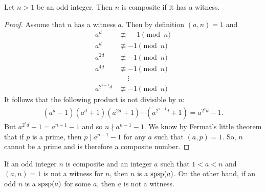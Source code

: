 \documentclass{subfiles}
\begin{document}
		\begin{theorem}
			Let $n>1$ be an odd integer. Then $n$ is composite if it has a witness.
		\end{theorem}

		\begin{proof}
			Assume that $n$ has a witness $a$. Then by definition $(a,n)=1$ and
				\begin{align*}
					a^d &\not \equiv \phantom{-}1 \pmod n\\
					a^d &\not \equiv -1 \pmod n\\
					a^{2d} &\not \equiv -1 \pmod n\\
					a^{4d} &\not \equiv -1 \pmod n\\
					&\phantom{\equiv}\vdots\\
					a^{2^{s-1}d} &\not \equiv -1 \pmod n
				\end{align*}
			It follows that the following product is not divisible by $n$:
				\begin{align*}
					\left(a^d-1\right)\left(a^d+1\right)\left(a^{2d}+1\right)\cdots \left(a^{2^{s-1}d}+1\right) = a^{2^sd}-1.
				\end{align*}
			But $a^{2^sd}-1=a^{n-1}-1$ and so $n\nmid a^{n-1}-1$. We know by Fermat's little theorem that if $p$ is a prime, then $p\mid a^{p-1}-1$ for any $a$ such that $(a,p)=1$. So, $n$ cannot be a prime and is therefore a composite number.
		\end{proof}

		\begin{note}
			If an odd integer $n$ is composite and an integer $a$ such that $1<a<n$ and $(a,n)=1$ is not a witness for $n$, then $n$ is a $\operatorname{spsp}(a)$. On the other hand, if an odd $n$ is a $\operatorname{spsp}(a)$ for some $a$, then $a$ is not a witness.
		\end{note}
\end{document}
